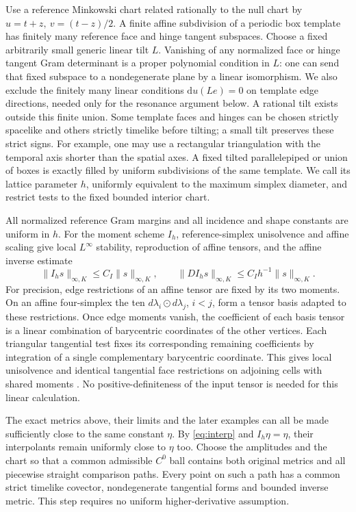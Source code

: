 \documentclass[11pt]{article}
\newcommand{\dd}{\mathrm d}
\begin{document}
Use a reference Minkowski chart related rationally to the null
chart by \(u=t+z,\ v=(t-z)/2\). A finite affine subdivision of a
periodic box template has finitely many reference face and hinge
tangent subspaces. Choose a fixed arbitrarily small generic linear
tilt \(L\). Vanishing of any normalized face or hinge tangent
Gram determinant is a proper polynomial condition in \(L\):
one can send that fixed subspace to a nondegenerate plane by
a linear isomorphism. We also exclude the finitely many linear
conditions \(\dd u(L e)=0\) on template edge directions, needed
only for the resonance argument below. A rational tilt exists
outside this finite union. Some template faces and hinges can
be chosen strictly spacelike and others strictly timelike before
tilting; a small tilt preserves these strict signs. For example,
one may use a rectangular triangulation with the temporal axis
shorter than the spatial axes. A fixed tilted parallelepiped or
union of boxes is exactly filled by uniform subdivisions of the
same template. We call its lattice parameter \(h\), uniformly
equivalent to the maximum simplex diameter, and restrict tests
to the fixed bounded interior chart.

All normalized reference Gram margins and all incidence and
shape constants are uniform in \(h\). For the moment scheme
\(I_h\), reference-simplex unisolvence and affine scaling give
local \(L^\infty\) stability, reproduction of affine tensors,
and the affine inverse estimate
\begin{equation}
 \|I_hs\|_{\infty,K}\le C_I\|s\|_{\infty,K},\qquad
 \|D I_hs\|_{\infty,K}\le C_Ih^{-1}\|s\|_{\infty,K}.
 \label{eq:interp}
\end{equation}
For precision, edge restrictions of an affine tensor are fixed
by its two moments. On an affine four-simplex the ten
\(d\lambda_i\odot d\lambda_j\), \(i<j\), form a tensor basis
adapted to these restrictions. Once edge moments vanish, the
coefficient of each basis tensor is a linear combination of
barycentric coordinates of the other vertices. Each triangular
tangential test fixes its corresponding remaining coefficients
by integration of a single complementary barycentric coordinate.
This gives local unisolvence and identical tangential face
restrictions on adjoining cells with shared moments
\cite{SignedRegge}. No positive-definiteness of the input tensor
is needed for this linear calculation.

The exact metrics above, their limits and the later examples
can all be made sufficiently close to the same constant
\(\eta\). By \eqref{eq:interp} and \(I_h\eta=\eta\),
their interpolants remain uniformly close to \(\eta\) too.
Choose the amplitudes and the chart so that a common admissible
\(C^0\) ball contains both original metrics and all piecewise
straight comparison paths. Every point on such a path has
a common strict timelike covector, nondegenerate tangential
forms and bounded inverse metric. This step requires no
uniform higher-derivative assumption.
\end{document}
